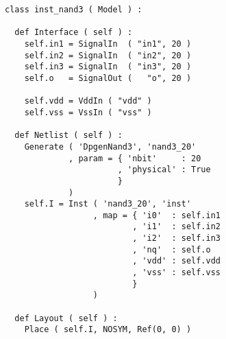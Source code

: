 \begin{itemize}
\begin{verbatim}
class inst_nand3 ( Model ) :

  def Interface ( self ) :
    self.in1 = SignalIn  ( "in1", 20 )
    self.in2 = SignalIn  ( "in2", 20 )
    self.in3 = SignalIn  ( "in3", 20 )
    self.o   = SignalOut (   "o", 20 )

    self.vdd = VddIn ( "vdd" )
    self.vss = VssIn ( "vss" )
    
  def Netlist ( self ) :
    Generate ( 'DpgenNand3', 'nand3_20'
             , param = { 'nbit'     : 20
                       , 'physical' : True
                       }
             )
    self.I = Inst ( 'nand3_20', 'inst'
                  , map = { 'i0'  : self.in1
                          , 'i1'  : self.in2
                          , 'i2'  : self.in3
                          , 'nq'  : self.o
                          , 'vdd' : self.vdd
                          , 'vss' : self.vss
                          }
                  )
    
  def Layout ( self ) :
    Place ( self.I, NOSYM, Ref(0, 0) )
\end{verbatim}
\end{itemize}
